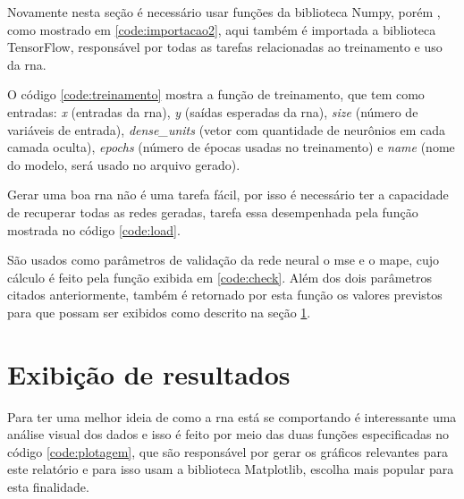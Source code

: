 \documentclass[12pt]{article}
\begin{document}
Novamente nesta seção é necessário usar funções da biblioteca Numpy, porém , como mostrado em \ref{code:importacao2}, aqui também é importada a biblioteca TensorFlow, responsável por todas as tarefas relacionadas ao treinamento e uso da \acrshort{rna}.



O código \ref{code:treinamento} mostra a função de treinamento, que tem como entradas: \textit{x} (entradas da \acrshort{rna}), \textit{y} (saídas esperadas da \acrshort{rna}), \textit{size} (número de variáveis de entrada), \textit{dense\_units} (vetor com quantidade de neurônios em cada camada oculta), \textit{epochs} (número de épocas usadas no treinamento) e \textit{name} (nome do modelo, será usado no arquivo gerado).




Gerar uma boa \acrshort{rna} não é uma tarefa fácil, por isso é necessário ter a capacidade de recuperar todas as redes geradas, tarefa essa desempenhada pela função mostrada no código \ref{code:load}.



São usados como parâmetros de validação da rede neural o \acrfull{mse} e o \acrfull{mape}, cujo cálculo é feito pela função exibida em \ref{code:check}. Além dos dois parâmetros citados anteriormente, também é retornado por esta função os valores previstos para que possam ser exibidos como descrito na seção \ref{sec:exibicao}.

\section{Exibição de resultados}
\label{sec:exibicao}



Para ter uma melhor ideia de como a \acrshort{rna} está se comportando é interessante uma análise visual dos dados e isso é feito por meio das duas funções especificadas no código \ref{code:plotagem}, que são responsável por gerar os gráficos relevantes para este relatório e para isso usam a biblioteca Matplotlib, escolha mais popular para esta finalidade.
\end{document}
